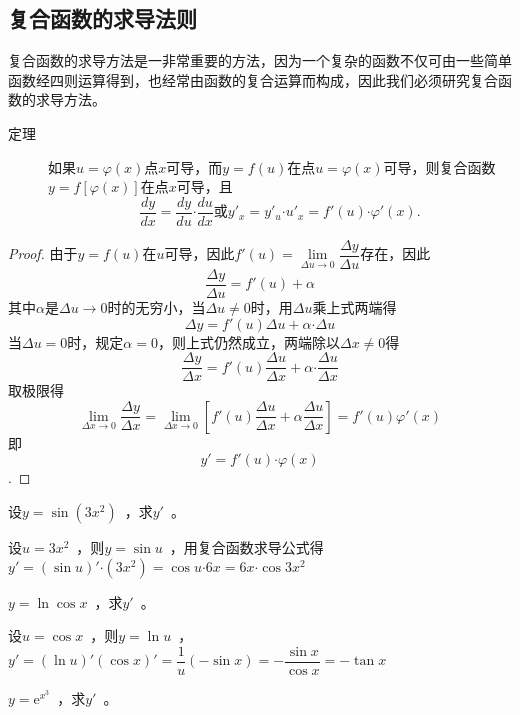 \subsection{复合函数的求导法则}
复合函数的求导方法是一非常重要的方法，因为一个复杂的函数不仅可由一些简单函数经四则运算得到，也经常由函数的复合运算而构成，因此我们必须研究复合函数的求导方法。
\begin{description}
\item[{\kaishu {}\hspace{2em}\color{cyan}定理}]\hspace{1.5em}如果$u=\varphi(x)$点$x$可导，而$y=f(u)$在点$u=\varphi(x)$可导，则复合函数$y=f\left[\varphi(x)\right]$在点$x$可导，且\[\dfrac{dy}{dx}=\dfrac{dy}{du}\bm\cdot \dfrac{du}{dx}\text{或}y'_x=y'_u\bm\cdot u'_x=f'\left(u\right)\bm\cdot \varphi'\left(x\right).\]
\end{description}
\begin{proof}
由于$y=f(u)$在$u$可导，因此$f'(u)=\lim\limits_{\Delta u\rightarrow 0}\dfrac{\Delta y}{\Delta u}$存在，因此\[\dfrac{\Delta y}{\Delta u}=f'(u)+\alpha\]其中$\alpha$是$\Delta u\rightarrow 0$时的无穷小，当$\Delta u\neq 0$时，用$\Delta u$乘上式两端得\[\Delta y=f'(u)\Delta u+\alpha \bm\cdot \Delta u\]当$\Delta u=0$时，规定$\alpha=0$，则上式仍然成立，两端除以$\Delta x\neq 0$得\[\dfrac{\Delta y}{\Delta x}=f'(u)\dfrac{\Delta u}{\Delta x}+\alpha\bm\cdot \dfrac{\Delta u}{\Delta x}\]	取极限得\[\lim\limits_{\Delta x\rightarrow 0}\dfrac{\Delta y}{\Delta x}=\lim\limits_{\Delta x\rightarrow 0}\left[f'(u)\dfrac{\Delta u}{\Delta x}+\alpha \dfrac{\Delta u}{\Delta x}\right]=f'(u)\varphi'(x)\]
即\[y'=f'(u)\bm\cdot \varphi(x)\].
\end{proof}
\begin{example}
设$y=\sin \left(3x^2\right)$~，求$y'$~。
\end{example}
\begin{solution}
设$u=3x^2$~，则$y=\sin u$~，用复合函数求导公式得
$y'=\left(\sin u\right)'\bm\cdot \left(3x^2\right)=\cos u\bm\cdot 6x=6x\bm\cdot \cos 3x^2$
\end{solution}
\begin{example}
$y=\ln \cos x$~，求$y'$~。
\end{example}
\begin{solution}
设$u=\cos x$~，则$y=\ln u$~，\\
$y'=\left(\ln u\right)'\left(\cos x\right)'=\dfrac{1}{u}\left(-\sin x\right)=-\dfrac{\sin x}{\cos x}=-\tan x$
\end{solution}
\begin{example}
$y=\mathrm{e}^{x^3}$~，求$y'$~。
\end{example}
